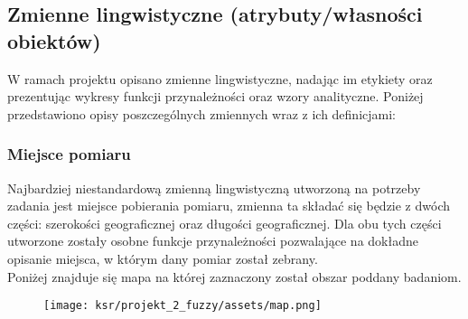 \documentclass{article}
\begin{document}
\subsection{Zmienne lingwistyczne (atrybuty/własności obiektów)}

W ramach projektu opisano zmienne lingwistyczne, nadając im etykiety oraz prezentując wykresy funkcji przynależności oraz wzory analityczne. Poniżej przedstawiono opisy poszczególnych zmiennych wraz z ich definicjami:

\subsubsection{Miejsce pomiaru}

Najbardziej niestandardową zmienną lingwistyczną utworzoną na potrzeby zadania jest miejsce pobierania pomiaru, zmienna ta składać się będzie z dwóch części: szerokości geograficznej oraz długości geograficznej. Dla obu tych części utworzone zostały osobne funkcje przynależności pozwalające na dokładne opisanie miejsca, w którym dany pomiar został zebrany. \\

Poniżej znajduje się mapa na której zaznaczony został obszar poddany badaniom.

\begin{figure}[H]
\centering
\texttt{[image: ksr/projekt\_2\_fuzzy/assets/map.png]}
\label{fig:epsilon_bat}
\end{figure}
\end{document}
